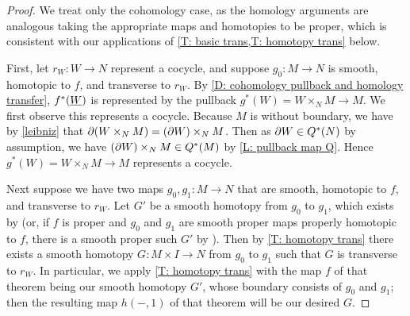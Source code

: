 \begin{proof}
	We treat only the cohomology case, as the homology arguments are analogous taking the appropriate maps and homotopies to be proper, which is consistent with our applications of \cref{T: basic trans,T: homotopy trans} below.

	First, let $r_W \colon W \to N$ represent a cocycle, and suppose $g_0 \colon M \to N$ is smooth, homotopic to $f$, and transverse to $r_W$.
	By \cref{D: cohomology pullback and homology transfer}, $f^*(\underline{W})$ is represented by the pullback $g^*(W) = W \times_N M \to M$.
	We first observe this represents a cocycle.
	Because $M$ is without boundary, we have by \cref{leibniz} that $\partial(W\times_N M) = (\partial W) \times_N M$.
	Then as $\partial W \in Q^*(N)$ by assumption, we have $(\partial W) \times_N M \in Q^*(M)$ by \cref{L: pullback map Q}.
	Hence $g^*(W) = W \times_N M \to M$ represents a cocycle.

	Next suppose we have two maps $g_0, g_1 \colon M \to N$ that are smooth, homotopic to $f$, and transverse to $r_W$.
	Let $G'$ be a smooth homotopy from $g_0$ to $g_1$, which exists by \cite[Proposition 9.2.33]{MaDo92} (or, if $f$ is proper and $g_0$ and $g_1$ are smooth proper maps properly homotopic to $f$, there is a smooth proper such $G'$ by \cite[Proposition 9.2.35]{MaDo92}).
	Then by \cref{T: homotopy trans} there exists a smooth homotopy $G \colon M \times I \to N$ from $g_0$ to $g_1$ such that $G$ is transverse to $r_W$.
	In particular, we apply \cref{T: homotopy trans} with the map $f$ of that theorem being our smooth homotopy $G'$, whose boundary consists of $g_0$ and $g_1$; then the resulting map $h(-,1)$ of that theorem will be our desired $G$.


\end{proof}
